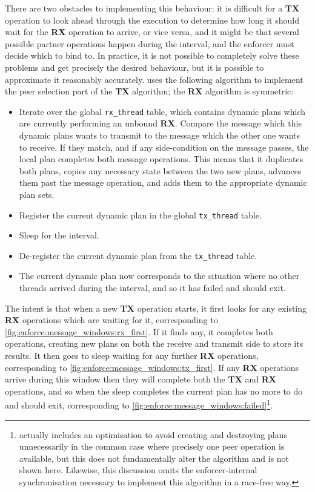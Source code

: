 There are two obstacles to implementing this behaviour: it is
difficult for a \textbf{TX} operation to look ahead through the
execution to determine how long it should wait for the \textbf{RX}
operation to arrive, or vice versa, and it might be that several
possible partner operations happen during the interval, and the
enforcer must decide which to bind to.  In practice, it is not
possible to completely solve these problems and get precisely the
desired behaviour, but it is possible to approximate it reasonably
accurately.  {\Implementation} uses the following algorithm to
implement the peer selection part of the \textbf{TX} algorithm; the
\textbf{RX} algorithm is symmetric:
\begin{itemize}
\item[1] Iterate over the global \texttt{rx\_thread} table, which
  contains dynamic plans which are currently performing an unbound
  \textbf{RX}.  Compare the message which this dynamic plans wants to
  transmit to the message which the other one wants to receive.  If
  they match, and if any side-condition on the message passes, the
  local plan completes both message operations.  This means that it
  duplicates both plans, copies any necessary state between the two
  new plans, advances them past the message operation, and adds them
  to the appropriate dynamic plan sets.
\item[2] Register the current dynamic plan in the global
  \texttt{tx\_thread} table.
\item[3] Sleep for the interval.
\item[4] De-register the current dynamic plan from the
  \texttt{tx\_thread} table.
\item[5] The current dynamic plan now corresponds to the situation
  where no other threads arrived during the interval, and so it has
  failed and should exit.
\end{itemize}
The intent is that when a new \textbf{TX} operation starts, it first
looks for any existing \textbf{RX} operations which are waiting for
it, corresponding to \autoref{fig:enforce:message_windows:rx_first}.
If it finds any, it completes both operations, creating new plans on
both the receive and transmit side to store its results.  It then goes
to sleep waiting for any further \textbf{RX} operations, corresponding
to \autoref{fig:enforce:message_windows:tx_first}.  If any \textbf{RX}
operations arrive during this window then they will complete both the
\textbf{TX} and \textbf{RX} operations, and so when the sleep
completes the current plan has no more to do and should exit,
corresponding to
\autoref{fig:enforce:message_windows:failed}\footnote{{\Implementation}
  actually includes an optimisation to avoid creating and destroying
  plans unnecessarily in the common case where precisely one peer
  operation is available, but this does not fundamentally alter the
  algorithm and is not shown here.  Likewise, this discussion omits
  the enforcer-internal synchronisation necessary to implement this
  algorithm in a race-free way.}.

